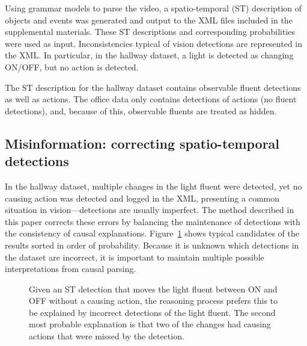 \documentclass[10pt,journal,letterpaper,compsoc]{IEEEtran}
\begin{document}
Using grammar models to parse the video, a spatio-temporal (ST) description of objects and events was generated and output to the XML files included in the supplemental materials.  These ST descriptions and corresponding probabilities were used as input. Inconsistencies typical of vision detections are represented in the XML.  In particular, in the hallway dataset, a light is detected as changing ON/OFF, but no action is detected. 

The ST description for the hallway dataset contains observable fluent detections as well as actions.  The office data only contains detections of actions (no fluent detections), and, because of this, observable fluents are treated as hidden.










\subsection{Misinformation: correcting spatio-temporal detections}

In the hallway dataset, multiple changes in the light fluent were detected, yet no causing action was detected and logged in the XML, presenting a common situation in vision---detections are usually imperfect.  The method described in this paper corrects these errors by balancing the maintenance of detections with the consistency of causal explanations.  Figure~\ref{fig:lightdetections} shows typical candidates of the results sorted in order of probability.  Because it is unknown which detections in the dataset are incorrect, it is important to maintain multiple possible interpretations from causal parsing.  


\begin{figure}[htp]
\centering

\caption{Given an ST detection that moves the light fluent between ON and OFF without a causing action, the reasoning process prefers this to be explained by incorrect detections of the light fluent.  The second most probable explanation is that two of the changes had causing actions that were missed by the detection.
 \label{fig:lightdetections}}
\end{figure}
\end{document}
